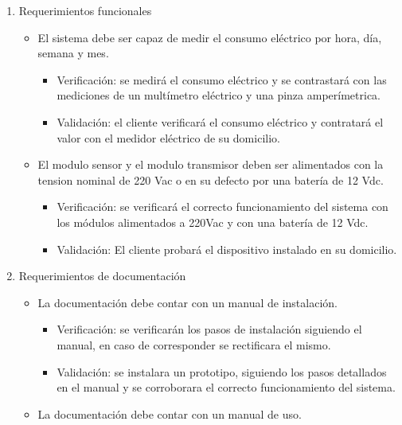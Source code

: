 \documentclass[
11pt, %
]{charter}
\begin{document}
\begin{enumerate}
	\item Requerimientos funcionales
		\begin{itemize}

			\item El sistema debe ser capaz de medir el consumo eléctrico por hora, día, semana y mes.

			\begin{itemize}
			\item Verificación: se medirá el consumo eléctrico y se contrastará con las mediciones de un multímetro eléctrico y una pinza amperímetrica.
			\item Validación: el cliente verificará el consumo eléctrico y contratará el valor con el medidor eléctrico de su domicilio.
			\end{itemize}

	\item El modulo sensor y el modulo transmisor deben ser alimentados con la tension nominal de 220 Vac o en su defecto por una batería de 12 Vdc.
			
			\begin{itemize}
		\item Verificación: se verificará el correcto funcionamiento del sistema con los módulos alimentados a 220Vac y con una batería de 12 Vdc.
			\item Validación: El cliente probará el dispositivo instalado en su domicilio.
			\end{itemize}
			
		\end{itemize}
		
	\item Requerimientos de documentación
		\begin{itemize}

		\item La documentación debe contar con un manual de instalación.
			
		\begin{itemize}
		\item Verificación: se verificarán los pasos de instalación siguiendo el manual, en caso de  corresponder se rectificara el mismo. 
		\item Validación: se instalara un prototipo, siguiendo los pasos detallados en el manual y se corroborara el correcto funcionamiento del sistema.
		\end{itemize}
			
		\item La documentación debe contar con un manual de uso.
		

\end{itemize}
\end{enumerate}
\end{document}

